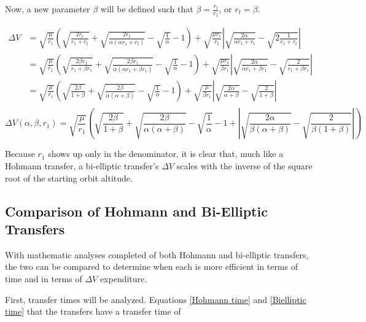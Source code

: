 \documentclass[../main.tex]{subfiles}
\begin{document}
Now, a new parameter $\beta$ will be defined such that $\beta=\frac{r_t}{r_1}$, or $r_t=\beta$.

\begin{align*}
    \Delta V & = \sqrt{\frac{\mu}{r_1}}\left(\sqrt{\frac{2r_t}{r_1+r_t}}+\sqrt{\frac{2r_t}{\alpha(\alpha r_1+r_t)}}-\sqrt{\frac{1}{\alpha}}-1\right)+\sqrt{\frac{\mu r_1}{r_t}}\left|\sqrt{\frac{2\alpha}{\alpha r_1+r_t}}-\sqrt{2\frac{1}{r_1+r_t}}\right|                                         \\
             & =\sqrt{\frac{\mu}{r_1}}\left(\sqrt{\frac{2\beta r_1}{r_1+\beta r_1}}+\sqrt{\frac{2\beta r_1}{\alpha(\alpha r_1+\beta r_1)}}-\sqrt{\frac{1}{\alpha}}-1\right)+\sqrt{\frac{\mu r_1}{\beta r_1}}\left|\sqrt{\frac{2\alpha}{\alpha r_1+\beta r_1}}-\sqrt{\frac{2}{r_1+\beta r_1}}\right| \\
             & =\sqrt{\frac{\mu}{r_1}}\left(\sqrt{\frac{2\beta}{1+\beta}}+\sqrt{\frac{2\beta}{\alpha(\alpha+\beta)}}-\sqrt{\frac{1}{\alpha}}-1\right)+\sqrt{\frac{\mu}{\beta r_1}}\left|\sqrt{\frac{2\alpha}{\alpha+\beta}}-\sqrt{\frac{2}{1+\beta}}\right|                                         \\
\end{align*}
\begin{equation}\label{Bi-Elliptic DeltaV in terms of alpha, beta, r1}
    \Delta V(\alpha,\beta,r_1) = \sqrt{\frac{\mu}{r_1}}\left(\sqrt{\frac{2\beta}{1+\beta}}+\sqrt{\frac{2\beta}{\alpha(\alpha+\beta)}}-\sqrt{\frac{1}{\alpha}}-1+\left|\sqrt{\frac{2\alpha}{\beta(\alpha+\beta)}}-\sqrt{\frac{2}{\beta(1+\beta)}}\right|\right)
\end{equation}

Because $r_1$ shows up only in the denominator, it is clear that, much like a Hohmann transfer, a bi-elliptic transfer's $\Delta V$ scales with the inverse of the square root of the starting orbit altitude.

\subsection{Comparison of Hohmann and Bi-Elliptic Transfers}

With mathematic analyses completed of both Hohmann and bi-elliptic transfers, the two can be compared to determine when each is more efficient in terms of time and in terms of $\Delta V$ expenditure.

First, transfer times will be analyzed. Equations \eqref{Hohmann time} and \eqref{Bielliptic time} that the transfers have a transfer time of
\end{document}
